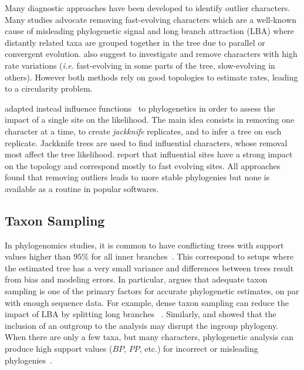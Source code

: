 Many diagnostic approaches have been developed to identify outlier characters. Many studies \citep{Rodriguez-Ezpeleta2007, Burleigh2004} advocate removing fast-evolving characters which are a well-known cause of misleading phylogenetic signal and long branch attraction (LBA) where distantly related taxa are grouped together in the tree due to parallel or convergent evolution. \citet{Lopez1999} also suggest to investigate and remove characters with high rate variations (\emph{i.e.} fast-evolving in some parts of the tree, slow-evolving in others). However both methods rely on good topologies to estimate rates, leading to a circularity problem. 

\citet{Bar-Hen2008} adapted instead influence functions~\citep{Hampel1974} to phylogenetics in order to assess the impact of a single site on the likelihood. The main idea consists in removing one character at a time, to create \emph{jackknife} replicates, and to infer a tree on each replicate. Jackknife trees are used to find influential characters, whose removal most affect the tree likelihood. \citet{Bar-Hen2008} report that influential sites have a strong impact on the topology and correspond mostly to fast evolving sites. All approaches found that removing outliers leads to more stable phylogenies but none is available as a routine in popular softwares. 

\subsection{Taxon Sampling} \label{sec:rogue-taxa}

In phylogenomics studies, it is common to have conflicting trees with support values higher than $95$\% for all inner branches~\citep{Rydin2002}. This correspond to setups where the estimated tree has a very small variance and differences between trees result from bias and modeling errors. In particular, \citet{Swofford1996} argues that adequate taxon sampling is one of the primary factors for accurate phylogenetic estimates, on par with enough sequence data. For example, dense taxon sampling can reduce the impact of LBA by splitting long branches ~\citep{Felsenstein1978}. Similarly, \citet{Holland2003} and \citet{Shavit2007} showed that the inclusion of an outgroup to the analysis may disrupt the ingroup phylogeny. When there are only a few taxa, but many characters, phylogenetic analysis can produce high support values ($BP$, $PP$, etc.) for incorrect or misleading phylogenies~\citep{Rokas2003, Rokas2005, Heath2008}.

